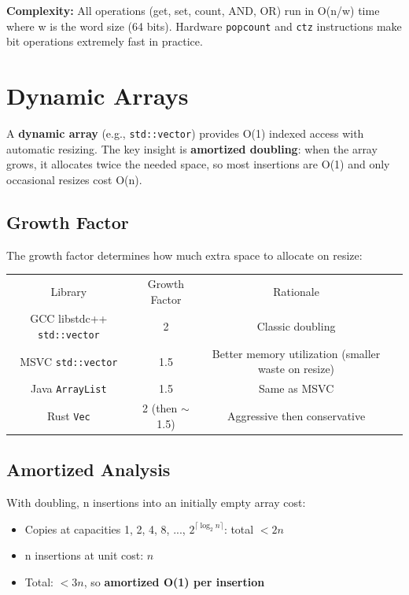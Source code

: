\textbf{Complexity:} All operations (get, set, count, AND, OR) run in O(n/w) time where w is the word size (64 bits). Hardware \texttt{popcount} and \texttt{ctz} instructions make bit operations extremely fast in practice.

\section{Dynamic Arrays}

A \textbf{dynamic array} (e.g., \texttt{std::vector}) provides O(1) indexed access with automatic resizing. The key insight is \textbf{amortized doubling}: when the array grows, it allocates twice the needed space, so most insertions are O(1) and only occasional resizes cost O(n).

\subsection{Growth Factor}

The growth factor determines how much extra space to allocate on resize:

\begin{center}
\begin{tabular}{cccc}
\toprule
Library & Growth Factor & Rationale \\
GCC libstdc++ \texttt{std::vector} & 2 & Classic doubling \\
MSVC \texttt{std::vector} & 1.5 & Better memory utilization (smaller waste on resize) \\
Java \texttt{ArrayList} & 1.5 & Same as MSVC \\
Rust \texttt{Vec} & 2 (then $\sim$1.5) & Aggressive then conservative \\
\bottomrule
\end{tabular}
\end{center}

\subsection{Amortized Analysis}

With doubling, n insertions into an initially empty array cost:
\begin{itemize}
\item Copies at capacities 1, 2, 4, 8, ..., $2^{\lceil \log_2 n \rceil}$: total $< 2n$
\item n insertions at unit cost: $n$
\item Total: $< 3n$, so \textbf{amortized O(1) per insertion}
\end{itemize}

